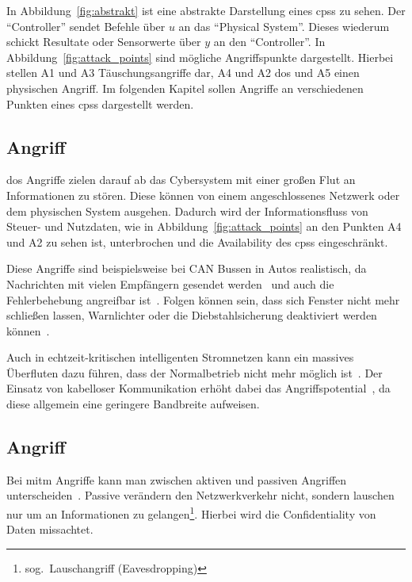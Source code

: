 \documentclass[final,bibliography=totocnumbered]{include/sikseminar}
\newcommand{\cps}{\glspl{cps}\xspace}
\begin{document}
In Abbildung~\ref{fig:abstrakt} ist eine abstrakte Darstellung eines \cps zu sehen.
Der \enquote{Controller} sendet Befehle über $u$ an das \enquote{Physical System}.
Dieses wiederum schickt Resultate oder Sensorwerte über $y$ an den \enquote{Controller}.
In Abbildung~\ref{fig:attack_points} sind mögliche Angriffspunkte dargestellt.
Hierbei stellen A1 und A3 Täuschungsangriffe dar, A4 und A2 \gls{dos} und A5 einen physischen Angriff.
Im folgenden Kapitel sollen Angriffe an verschiedenen Punkten eines \cps dargestellt werden.


\subsection{ Angriff}\label{subsec:dos}
\gls{dos} Angriffe zielen darauf ab das Cybersystem mit einer großen Flut an Informationen zu stören.
Diese können von einem angeschlossenes Netzwerk oder dem physischen System ausgehen.
Dadurch wird der Informationsfluss von Steuer- und Nutzdaten, wie in Abbildung~\ref{fig:attack_points} an den Punkten A4 und A2 zu sehen ist, unterbrochen und die Availability des \cps eingeschränkt.

Diese Angriffe sind beispielsweise bei CAN Bussen in Autos realistisch, da Nachrichten mit vielen Empfängern gesendet werden~\cite{KCR+10} und auch die Fehlerbehebung angreifbar ist~\cite{CDV13}.
Folgen können sein, dass sich Fenster nicht mehr schließen lassen, Warnlichter oder die Diebstahlsicherung deaktiviert werden können~\cite{HKD08}.

Auch in echtzeit-kritischen intelligenten Stromnetzen kann ein massives Überfluten dazu führen, dass der Normalbetrieb nicht mehr möglich ist~\cite{LLW+10}.
Der Einsatz von kabelloser Kommunikation erhöht dabei das Angriffspotential~\cite{LWW11}, da diese allgemein eine geringere Bandbreite aufweisen.

\subsection{ Angriff}\label{subsec:mitm}
Bei \gls{mitm} Angriffe kann man zwischen aktiven und passiven Angriffen unterscheiden~\cite{WYX+10}.
Passive verändern den Netzwerkverkehr nicht, sondern lauschen nur um an Informationen zu gelangen\footnote{sog.\ Lauschangriff (Eavesdropping)}.
Hierbei wird die Confidentiality von Daten missachtet.
\end{document}
